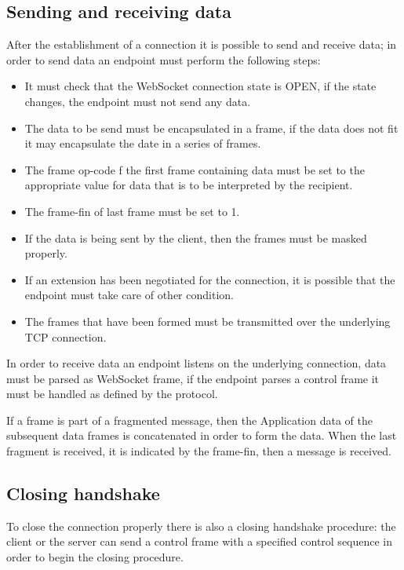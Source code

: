 \subsection{Sending and receiving data}
After the establishment of a connection it is possible to send and receive data; in order to send data an endpoint must perform the following steps:
\begin{itemize}
	\item It must check that the WebSocket connection state is OPEN, if the state changes, the endpoint must not send any data.
	\item The data to be send must be encapsulated in a frame, if the data does not fit it may encapsulate the date in a series of frames.
	\item The frame op-code f the first frame containing data must be set to the appropriate value for data that is to be interpreted by the recipient.
	\item The frame-fin of last frame must be set to 1.
	\item If the data is being sent by the client, then the frames must be masked properly.
	\item If an extension has been negotiated for the connection, it is possible that the endpoint must take care of other condition.
	\item The frames that have been formed must be transmitted over the underlying TCP connection.
\end{itemize}

In order to receive data an endpoint listens on the underlying connection, data must be parsed as WebSocket frame,
if the endpoint parses a control frame it must be handled as defined by the protocol.\newline

If a frame is part of a fragmented message, then the Application data of the subsequent data frames is concatenated in order to form the data.\newline
When the last fragment is received, it is indicated by the frame-fin, then a message is received.\newline

\subsection{Closing handshake}
To close the connection properly there is also a closing handshake procedure: the client or
the server can send a control frame with a specified control sequence in order to begin the closing procedure.\newline

